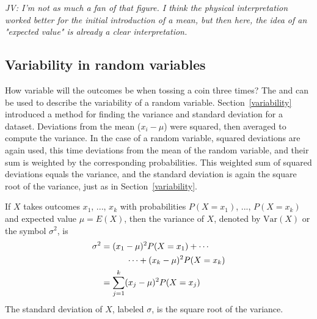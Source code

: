\textit{JV: I'm not as much a fan of that figure. I think the physical interpretation worked better for the initial introduction of a mean, but then here, the idea of an "expected value" is already a clear interpretation.}


\subsection{Variability in random variables}

How variable will the outcomes be when tossing a coin three times?  The  and  can be used to describe the variability of a random variable. Section~\ref{variability}
introduced a method for finding the variance and standard deviation for a dataset.  Deviations from the mean ($x_i - \mu$) were squared, then averaged to compute the variance. In the case of a random variable, squared deviations are again used, this time deviations from the mean of the random variable, and their sum is weighted by the corresponding probabilities. This weighted sum of squared deviations equals the variance, and the standard deviation is again the square root of the variance, just as in Section~\ref{variability}.

\begin{termBox}{
If $X$ takes outcomes $x_1$, ..., $x_k$ with probabilities $P(X=x_1)$, ..., $P(X=x_k)$ and expected value $\mu=E(X)$, then the variance of $X$, denoted by $\text{Var}(X)$ or the symbol $\sigma^2$, is
\begin{align}
\sigma^2 &= (x_1-\mu)^2 P(X=x_1) + \cdots \notag \\
	& \qquad\quad\cdots+ (x_k-\mu)^2 P(X=x_k) \notag \\
	&= \sum_{j=1}^{k} (x_j - \mu)^2 P(X=x_j)
\end{align}
The standard deviation of $X$, labeled $\sigma$, is the square root of the variance.}
\end{termBox}

